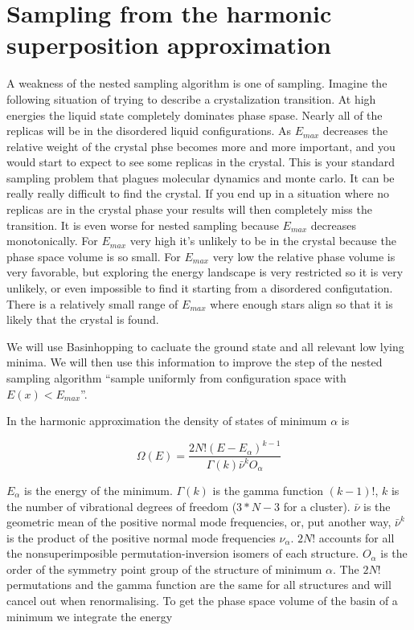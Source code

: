 \documentclass[a4paper]{article}
\begin{document}
\section{Sampling from the harmonic superposition approximation}

A weakness of the nested sampling algorithm is one of sampling.  Imagine the following situation
of trying to describe a crystalization transition.  At high energies the liquid state
completely dominates phase spase.  Nearly all of the replicas will be in the disordered liquid
configurations.  As $E_{max}$ decreases the relative weight of the crystal phse becomes more 
and more important, and you would start to expect to see some replicas in the crystal.  This is
your standard sampling problem that plagues molecular dynamics and monte carlo.
It can be really really difficult to find the crystal.  If you end up in a
situation where no replicas are in the crystal phase your results will then
completely miss the transition.  It is even worse for nested sampling because $E_{max}$ decreases
monotonically. For $E_{max}$ very high it's unlikely to be in the crystal because the phase space 
volume is so small.  For $E_{max}$ very low the relative phase volume is very
favorable, but exploring the energy landscape is very restricted so it is very
unlikely, or even impossible to find it starting from a disordered
configutation.  There is a relatively small range of $E_{max}$ where enough stars align so that
it is likely that the crystal is found.

We will use Basinhopping to cacluate the ground state and all relevant low lying minima.
We will then use this information to improve the step of the nested sampling
algorithm ``sample uniformly from configuration space with $E(x) < E_{max}$''.

In the harmonic approximation the density of states of minimum $\alpha$ is

\begin{equation}
  \Omega(E) = \frac{2N!(E - E_\alpha)^{k-1} }{\Gamma(k) \bar{\nu}^k O_\alpha}
\end{equation}

$E_\alpha$ is the energy of the minimum.  $\Gamma(k)$ is the gamma function $(k-1)!$, $k$ is the number
of vibrational degrees of freedom ($3*N-3$ for a cluster).  $\bar{\nu}$ is the geometric mean of the positive normal mode frequencies, or, put another way, $\bar{\nu}^k$ is the product of the positive normal mode frequencies $\nu_{\alpha}$.  $2N!$ accounts for all the nonsuperimposible permutation-inversion isomers of each structure. $O_\alpha$ is the order of the symmetry point group of the structure of minimum $\alpha$.  The $2N!$ permutations and the gamma function are the same for all structures and will cancel out when renormalising.
To get the phase space volume of the basin of a minimum we integrate the energy
\end{document}
